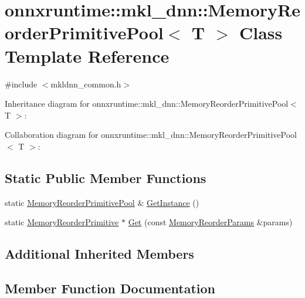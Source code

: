 \hypertarget{classonnxruntime_1_1mkl__dnn_1_1MemoryReorderPrimitivePool}{}\section{onnxruntime\+:\+:mkl\+\_\+dnn\+:\+:Memory\+Reorder\+Primitive\+Pool$<$ T $>$ Class Template Reference}
\label{classonnxruntime_1_1mkl__dnn_1_1MemoryReorderPrimitivePool}


{\ttfamily \#include $<$mkldnn\+\_\+common.\+h$>$}



Inheritance diagram for onnxruntime\+:\+:mkl\+\_\+dnn\+:\+:Memory\+Reorder\+Primitive\+Pool$<$ T $>$\+:


Collaboration diagram for onnxruntime\+:\+:mkl\+\_\+dnn\+:\+:Memory\+Reorder\+Primitive\+Pool$<$ T $>$\+:
\subsection*{Static Public Member Functions}
\begin{DoxyCompactItemize}
\item 
static \mbox{\hyperlink{classonnxruntime_1_1mkl__dnn_1_1MemoryReorderPrimitivePool}{Memory\+Reorder\+Primitive\+Pool}} \& \mbox{\hyperlink{classonnxruntime_1_1mkl__dnn_1_1MemoryReorderPrimitivePool_a41a9e35c7e1afee6815409098f485e62}{Get\+Instance}} ()
\item 
static \mbox{\hyperlink{classonnxruntime_1_1mkl__dnn_1_1MemoryReorderPrimitive}{Memory\+Reorder\+Primitive}} $\ast$ \mbox{\hyperlink{classonnxruntime_1_1mkl__dnn_1_1MemoryReorderPrimitivePool_ae713dc07d691fcd75016c3ac02a71d32}{Get}} (const \mbox{\hyperlink{structonnxruntime_1_1mkl__dnn_1_1MemoryReorderParams}{Memory\+Reorder\+Params}} \&params)
\end{DoxyCompactItemize}
\subsection*{Additional Inherited Members}


\subsection{Member Function Documentation}
\mbox{\label{classonnxruntime_1_1mkl__dnn_1_1MemoryReorderPrimitivePool_ae713dc07d691fcd75016c3ac02a71d32}} 
